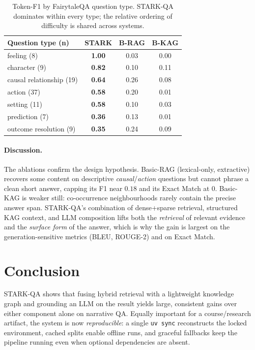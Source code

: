 \documentclass[11pt]{article}
\begin{document}
\begin{table}[t]
\centering
\small
\begin{tabular}{@{}lccc@{}}
\toprule
\textbf{Question type} (n) & \textbf{STARK} & \textbf{B-RAG} & \textbf{B-KAG} \\
\midrule
feeling (8)              & \textbf{1.00} & 0.03 & 0.00 \\
character (9)            & \textbf{0.82} & 0.10 & 0.11 \\
causal relationship (19) & \textbf{0.64} & 0.26 & 0.08 \\
action (37)             & \textbf{0.58} & 0.20 & 0.01 \\
setting (11)            & \textbf{0.58} & 0.10 & 0.03 \\
prediction (7)          & \textbf{0.36} & 0.13 & 0.01 \\
outcome resolution (9)  & \textbf{0.35} & 0.24 & 0.09 \\
\bottomrule
\end{tabular}
\caption{Token-F1 by FairytaleQA question type. STARK-QA dominates within every
type; the relative ordering of difficulty is shared across systems.}
\label{tab:bytype}
\end{table}

\paragraph{Discussion.} The ablations confirm the design hypothesis. Basic-RAG
(lexical-only, extractive) recovers some content on descriptive
\emph{causal}/\emph{action} questions but cannot phrase a clean short answer,
capping its F1 near $0.18$ and its Exact Match at $0$. Basic-KAG is weaker still:
co-occurrence neighbourhoods rarely contain the precise answer span. STARK-QA's
combination of dense+sparse retrieval, structured KAG context, and LLM
composition lifts both the \emph{retrieval} of relevant evidence and the
\emph{surface form} of the answer, which is why the gain is largest on the
generation-sensitive metrics (BLEU, ROUGE-2) and on Exact Match.

\section{Conclusion}
STARK-QA shows that fusing hybrid retrieval with a lightweight knowledge graph
and grounding an LLM on the result yields large, consistent gains over either
component alone on narrative QA. Equally important for a course/research artifact,
the system is now \emph{reproducible}: a single \texttt{uv sync} reconstructs the
locked environment, cached splits enable offline runs, and graceful fallbacks
keep the pipeline running even when optional dependencies are absent.
\end{document}
